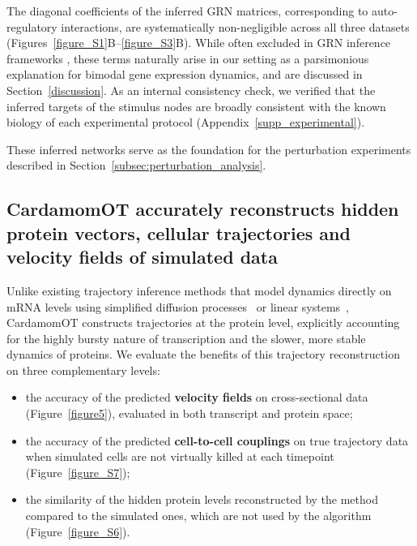 \documentclass[a4paper, 11pt]{article}
\theoremstyle{plain}
\theoremstyle{remark}
\newcommand*{\firstreview}[1]{{\color{black}#1}}
\begin{document}
The diagonal coefficients of the inferred GRN matrices, corresponding to auto-regulatory
interactions, are systematically non-negligible across all three datasets
(Figures~\ref{figure_S1}B--\ref{figure_S3}B). While often excluded in GRN inference frameworks
\cite{huynh2010inferring}, these terms naturally arise in our setting as a parsimonious
explanation for bimodal gene expression dynamics, and are discussed in
Section~\ref{discussion}. \firstreview{As an internal consistency check, we verified that the
inferred targets of the stimulus nodes are broadly consistent with the known biology of each
experimental protocol (Appendix~\ref{supp_experimental}).}

These inferred networks serve as the foundation for the perturbation experiments described in
Section~\ref{subsec:perturbation_analysis}.

\subsection{CardamomOT accurately reconstructs hidden protein vectors, cellular trajectories and velocity fields \texorpdfstring{\firstreview{of simulated data}}{of simulated data}}
\label{subsec:trajectory_inference_validation}

Unlike existing trajectory inference methods that model dynamics directly on mRNA levels
using simplified diffusion processes~\cite{schiebinger2019optimal} or linear
systems~\cite{zhang2024joint}, CardamomOT constructs trajectories at the protein
level, explicitly accounting for the highly bursty nature of transcription and the slower,
more stable dynamics of proteins. We evaluate the benefits of this trajectory reconstruction on three complementary
levels:
\begin{itemize}
    \item the accuracy of the predicted \textbf{velocity fields} on cross-sectional
data (Figure~\ref{figure5}), evaluated in both transcript and protein space;
    \item the accuracy of the predicted \textbf{cell-to-cell
couplings} on true trajectory data when simulated cells are not virtually killed at each timepoint (Figure~\ref{figure_S7});
    \item the similarity of the hidden protein levels reconstructed by the method compared to the simulated ones, which are not used by the algorithm (Figure~\ref{figure_S6}).
\end{itemize}
\end{document}
